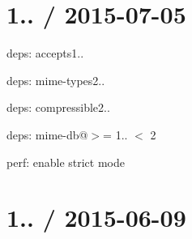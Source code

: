 \section*{1.. / 2015-\/07-\/05 }


\begin{DoxyItemize}
\item deps\+: accepts1..
\begin{DoxyItemize}
\item deps\+: mime-\/types2..
\end{DoxyItemize}
\item deps\+: compressible2..
\begin{DoxyItemize}
\item deps\+: mime-\/db@\textquotesingle{}$>$= 1.. $<$ 2\textquotesingle{}
\item perf\+: enable strict mode
\end{DoxyItemize}
\end{DoxyItemize}

\section*{1.. / 2015-\/06-\/09 }


